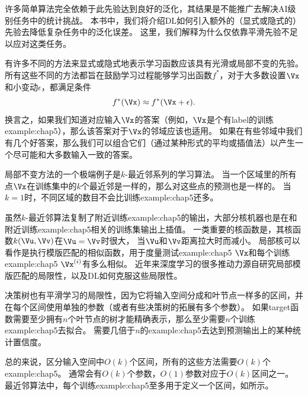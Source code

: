 许多简单算法完全依赖于此先验达到良好的泛化，其结果是不能推广去解决\gls{AI}级别任务中的统计挑战。
本书中，我们将介绍\gls{DL}如何引入额外的（显式或隐式的）先验去降低复杂任务中的泛化误差。
这里，我们解释为什么仅依靠平滑先验不足以应对这类任务。

有许多不同的方法来显式或隐式地表示学习函数应该具有光滑或局部不变的先验。
所有这些不同的方法都旨在鼓励学习过程能够学习出函数$f^*$，对于大多数设置$\Vx$和小变动$\epsilon$，都满足条件
\begin{equation}
    f^*(\Vx) \approx f^*(\Vx + \epsilon).
\end{equation}
换言之，如果我们知道对应输入$\Vx$的答案（例如，$\Vx$是个有\gls{label}的训练\gls{example:chap5}），那么该答案对于$\Vx$的邻域应该也适用。
如果在有些邻域中我们有几个好答案，那么我们可以组合它们（通过某种形式的平均或插值法）以产生一个尽可能和大多数输入一致的答案。

局部不变方法的一个极端例子是$k$-最近邻系列的学习算法。
当一个区域里的所有点$\Vx$在训练集中的$k$个最近邻是一样的，那么对这些点的预测也是一样的。
当$k=1$时，不同区域的数目不会比训练\gls{example:chap5}还多。

虽然$k$-最近邻算法复制了附近训练\gls{example:chap5}的输出，大部分核机器也是在和附近训练\gls{example:chap5}相关的训练集输出上插值。
一类重要的核函数是，其核函数$k(\Vu,\Vv)$在$\Vu=\Vv$时很大，
当$\Vu$和$\Vv$距离拉大时而减小。
局部核可以看作是执行模版匹配的相似函数，用于度量测试\gls{example:chap5} $\Vx$和每个训练\gls{example:chap5} $\Vx^{(i)}$有多么相似。
近年来深度学习的很多推动力源自研究局部模版匹配的局限性，以及\gls{DL}如何克服这些局限性\citep{Bengio-localfailure-NIPS-2006-small}。

决策树也有平滑学习的局限性，因为它将输入空间分成和叶节点一样多的区间，并在每个区间使用单独的参数（或者有些决策树的拓展有多个参数）。
如果\gls{target}函数需要至少拥有$n$个叶节点的树才能精确表示，那么至少需要$n$个训练\gls{example:chap5}去拟合。
需要几倍于$n$的\gls{example:chap5}去达到预测输出上的某种统计置信度。


总的来说，区分输入空间中$O(k)$个区间，所有的这些方法需要$O(k)$个\gls{example:chap5}。
通常会有$O(k)$个参数，$O(1)$参数对应于$O(k)$区间之一。
最近邻算法中，每个训练\gls{example:chap5}至多用于定义一个区间，如所示。


